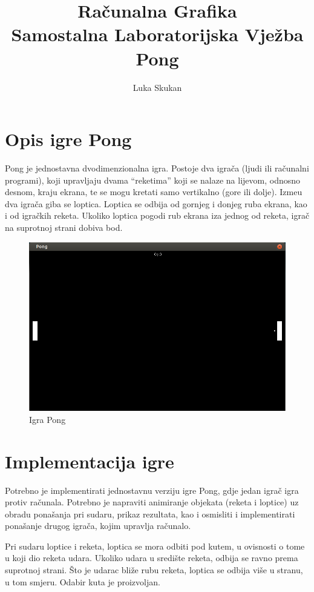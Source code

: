 \documentclass[10pt,a4paper]{article}
\author{Luka Skukan}
\title{Ra\v{c}unalna Grafika\\Samostalna Laboratorijska Vje\v{z}ba\\Pong}
\date{}
\begin{document}
\maketitle

\section{Opis igre Pong}

Pong je jednostavna dvodimenzionalna igra. Postoje dva igra\v{c}a (ljudi ili ra\v{c}unalni programi), koji upravljaju dvama ``reketima'' koji se nalaze na lijevom, odnosno desnom, kraju ekrana, te se mogu kretati samo vertikalno (gore ili dolje). Izme\dj{}u dva igra\v{c}a giba se loptica. Loptica se odbija od gornjeg i donjeg ruba ekrana, kao i od igra\v{c}kih reketa. Ukoliko loptica pogodi rub ekrana iza jednog od reketa, igra\v{c} na suprotnoj strani dobiva bod.

\begin{figure}[h]
	\center
	\includegraphics[scale=0.5]{pong}
	\caption{Igra Pong}
\end{figure}

\section{Implementacija igre}

Potrebno je implementirati jednostavnu verziju igre Pong, gdje jedan igra\v{c} igra protiv ra\v{c}unala. Potrebno je napraviti animiranje objekata (reketa i loptice) uz obradu pona\v{s}anja pri sudaru, prikaz rezultata, kao i osmisliti i implementirati pona\v{s}anje drugog igra\v{c}a, kojim upravlja ra\v{c}unalo.

Pri sudaru loptice i reketa, loptica se mora odbiti pod kutem, u ovisnosti o tome u koji dio reketa udara. Ukoliko udara u sredi\v{s}te reketa, odbija se ravno prema suprotnoj strani. \v{S}to je udarac bli\v{z}e rubu reketa, loptica se odbija vi\v{s}e u stranu, u tom smjeru. Odabir kuta je proizvoljan.
\end{document}
